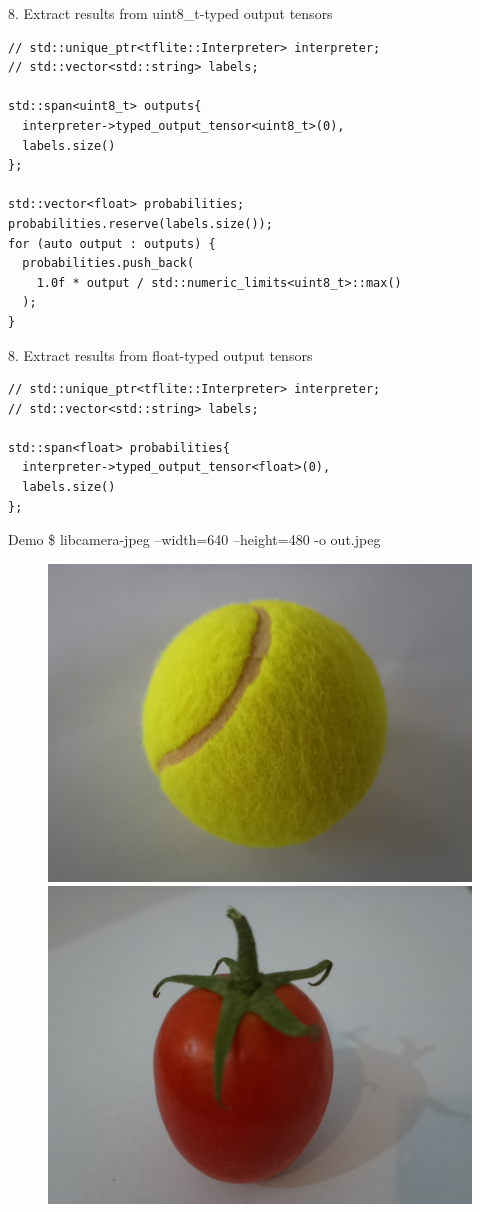 \begin{frame}[fragile]{8. Extract results from uint8\_t-typed output tensors}
  \lstset{basicstyle=\ttfamily\small, numbers=left, columns=fullflexible}
  \begin{lstlisting}
// std::unique_ptr<tflite::Interpreter> interpreter;
// std::vector<std::string> labels;

std::span<uint8_t> outputs{
  interpreter->typed_output_tensor<uint8_t>(0),
  labels.size()
};

std::vector<float> probabilities;
probabilities.reserve(labels.size());
for (auto output : outputs) {
  probabilities.push_back(
    1.0f * output / std::numeric_limits<uint8_t>::max()
  );
}
  \end{lstlisting}
\end{frame}

\begin{frame}[fragile]{8. Extract results from float-typed output tensors}
  \lstset{basicstyle=\ttfamily\small, numbers=left, columns=fullflexible}
  \begin{lstlisting}
// std::unique_ptr<tflite::Interpreter> interpreter;
// std::vector<std::string> labels;

std::span<float> probabilities{
  interpreter->typed_output_tensor<float>(0),
  labels.size()
};
  \end{lstlisting}
\end{frame}

\begin{frame}{Demo}
  \ttfamily \$ libcamera-jpeg --width=640 --height=480 -o out.jpeg
  \begin{figure}
	\includegraphics[width=0.5\linewidth,height=0.5\textheight,keepaspectratio]{../images/tennis_ball_input.jpeg}%
	\includegraphics[width=0.5\linewidth,height=0.5\textheight,keepaspectratio]{images/tomato.jpeg}
  \end{figure}
\end{frame}


